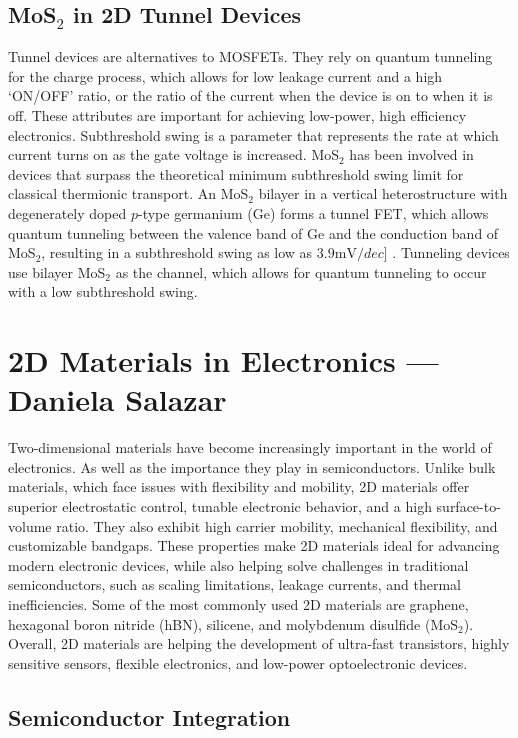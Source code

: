 \documentclass[conference]{IEEEtran}
\begin{document}
\subsection{MoS$_2$ in 2D Tunnel Devices}

Tunnel devices are alternatives to MOSFETs. They rely on quantum tunneling for the charge process, which allows for low leakage current and a high `\textsc{ON/OFF}' ratio, or the ratio of the current when the device is on to when it is off. These attributes are important for achieving low-power, high efficiency electronics. Subthreshold swing is a parameter that represents the rate at which current turns on as the gate voltage is increased. MoS$_2$ has been involved in devices that surpass the theoretical minimum subthreshold swing limit for classical thermionic transport. An MoS$_2$ bilayer in a vertical heterostructure with degenerately doped $p$-type germanium (Ge) forms a tunnel FET, which allows quantum tunneling between the valence band of Ge and the conduction band of MoS$_2$, resulting in a subthreshold swing as low as $3.9\si{\milli\volt\per dec}]$ \cite{oa11}. Tunneling devices use bilayer MoS$_2$ as the channel, which allows for quantum tunneling to occur with a low subthreshold swing. 

\section{2D Materials in Electronics — Daniela Salazar}

Two-dimensional materials have become increasingly important in the world of electronics. As well as the importance they play in semiconductors. Unlike bulk materials, which face issues with flexibility and mobility, 2D materials offer superior electrostatic control, tunable electronic behavior, and a high surface-to-volume ratio. They also exhibit high carrier mobility, mechanical flexibility, and customizable bandgaps. These properties make 2D materials ideal for advancing modern electronic devices, while also helping solve challenges in traditional semiconductors, such as scaling limitations, leakage currents, and thermal inefficiencies. Some of the most commonly used 2D materials are graphene, hexagonal boron nitride (hBN), silicene, and molybdenum disulfide (MoS$_2$). Overall, 2D materials are helping the development of ultra-fast transistors, highly sensitive sensors, flexible electronics, and low-power optoelectronic devices.

\subsection{Semiconductor Integration}
\end{document}
